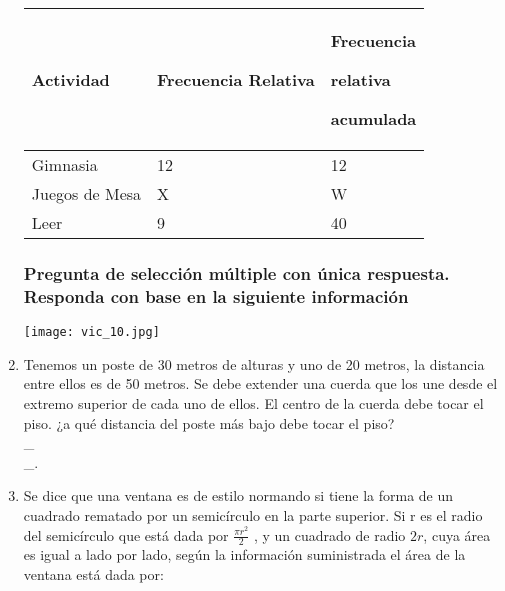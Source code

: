 \begin{enumerate}
\begin{center}
\begin{tabular}{p{2cm}|p{1.8cm} p{2.5cm}}
\hline \hline 
Actividad	&Frecuencia Relativa	&Frecuencia\par relativa\par acumulada 	\\
\hline \hline 
Gimnasia	&12	&12	\\
Juegos de Mesa	&X	&W	\\
Leer	&9	&40	\\
\hline \hline 
\end{tabular} 
\end{center}


\subsubsection*{Pregunta de selección múltiple con única respuesta. Responda con base en la siguiente información}

\texttt{[image: vic\_10.jpg]} 

\newpage
\item Tenemos un poste de 30 metros de alturas y uno de 20 metros, la distancia entre ellos es de 50 metros. Se debe extender una cuerda que los une desde el extremo superior de cada uno de ellos. El centro de la cuerda debe tocar el piso. ¿a qué distancia del poste más bajo debe tocar el piso? \label{vic-10}\hrulefill\\
\_\hrulefill\hrulefill\\
\_\hrulefill.


\item Se dice que una ventana es de estilo normando si tiene la forma de un cuadrado rematado por un semicírculo en la parte superior. Si r es el radio del semicírculo que está dada por $\frac{\pi r^2}{2}$  , y un cuadrado de radio $2r$, cuya área es igual a lado por lado, según la información suministrada el área de la ventana está dada por: \label{vic-11}


\end{enumerate}
